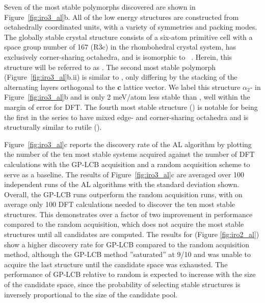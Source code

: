 %
Seven of the most stable \IrOthree polymorphs discovered are shown in Figure~\ref{fig:iro3_al}b.
%
All of the low energy \IrOthree structures are constructed from octahedrally coordinated units, with a variety of symmetries and packing modes.
%
The globally stable crystal structure consists of a six-atom primitive cell with a space group number of \num{167} (R$\overline{3}$c) in the rhombohedral crystal system, has exclusively corner-sharing octahedra, and is isomorphic to ~\cite{Hepworth1957}.
%
Herein, this structure will be referred to as \aIrOthree.
%
The second most stable polymorph (Figure~\ref{fig:iro3_al}b.ii) is similar to \aIrOthree,
only differing by the stacking of the alternating layers orthogonal to the \textbf{c} lattice vector.
%
We label this structure $\alpha_{2}$- in Figure~\ref{fig:iro3_al}b and is only 2 meV/atom less stable than \aIrOthree, well within the margin of error for DFT.
%
The fourth most stable structure (\rIrOthree) is notable for being the first in the series to have mixed edge- and corner-sharing octahedra and is structurally similar to rutile (\rIrOtwo).


%
%
Figure~\ref{fig:iro3_al}c reports the discovery rate of the AL algorithm by plotting
the number of the ten most stable systems acquired against the number of DFT calculations with the GP-LCB acquisition and a random acquisition scheme to serve as a baseline.
%
The results of Figure~\ref{fig:iro3_al}c are averaged over \num{100} independent runs of the AL algorithms with the standard deviation shown.
%
Overall, the GP-LCB runs outperform the random acquisition runs, with on average only \num{100} DFT calculations needed to discover the ten most stable structures.
%
This demonstrates over a factor of two improvement in performance compared to the random acquisition, which does not acquire the most stable structures until all candidates are computed.
%
The results for \IrOtwo (Figure \ref{fig:iro2_al}) show a higher discovery rate for GP-LCB compared to the random acquisition method,
although the GP-LCB method ''saturated'' at \num{9/10} and was unable to acquire the last structure until the candidate space was exhausted.
%
The performance of GP-LCB relative to random is expected to increase with the size of the candidate space, since the probability of selecting stable structures is inversely proportional to the size of the candidate pool.



